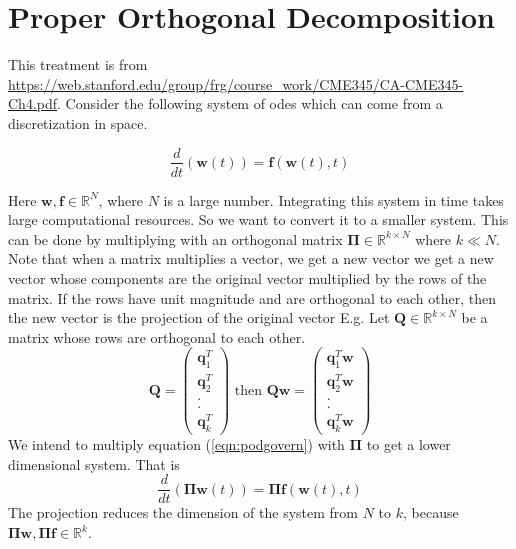 \documentclass{article}
\newcommand{\beq}{\begin{equation}}
\newcommand{\eeq}{\end{equation}}
\newcommand{\ber}{\begin{eqnarray}}
\newcommand{\eer}{\end{eqnarray}}
\newcommand{\dd}[2]{\frac{d}{d{#2}}{(#1)} }
\newcommand{\bw}{{\mathbf{w}}}
\newcommand{\bff}{\mathbf{f}}
\newcommand{\bPi}{\mathbf{\Pi}}
\newcommand{\bQ}{{\mathbf{Q}}}
\newcommand{\bq}{{\mathbf{q}}}
\begin{document}


\section{Proper Orthogonal Decomposition}
This treatment is from \url{https://web.stanford.edu/group/frg/course_work/CME345/CA-CME345-Ch4.pdf}. Consider the following system of odes which can come from a discretization in space.

\beq
\label{eqn:podgovern}
\dd{\bw(t)}{t} = \bff(\bw(t),t)
\eeq

Here $\bw,\bff \in \mathbb{R}^{N}$, where $N$ is a large number. Integrating this system in time takes large computational resources. So we want to convert it to a smaller system. This can be done by multiplying with an orthogonal matrix $\bPi\in\mathbb{R}^{k\times{N}}$ where $k\ll N$. Note that when a matrix multiplies a vector, we get a new vector we get a new vector whose components are the original vector multiplied by the rows of the matrix. If the rows have unit magnitude and are orthogonal to each other, then the new vector is the projection of the original vector E.g. Let $\bQ\in\mathbb{R}^{k\times{N}}$ be a matrix whose rows are orthogonal to each other.
\beq
\bQ = \begin{pmatrix} \bq_1^T\\ \bq_2^T\\ .\\ . \\ \bq_k^T\end{pmatrix} \text{ then }
\bQ\bw = \begin{pmatrix} \bq_1^T\bw\\ \bq_2^T\bw\\ .\\ . \\ \bq_k^T\bw\end{pmatrix}
\eeq
We intend to multiply equation (\ref{eqn:podgovern}) with $\bPi$ to get a lower dimensional system. That is 
\beq
\label{eqn:podgovernproj}
\dd{\bPi\bw(t)}{t} = \bPi\bff(\bw(t),t)
\eeq
The projection reduces the dimension of the system from $N$ to $k$, because $\bPi\bw,\bPi\bff \in \mathbb{R}^{k}$.\\
\end{document}
